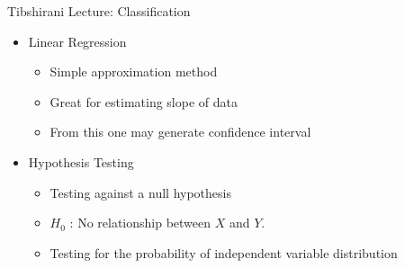 \documentclass{beamer}
\begin{document}
\begin{frame}{Tibshirani Lecture: Classification}
\begin{itemize}
	\item<1-> Linear Regression
	\begin{itemize}
		\item<1-> Simple approximation method
		\item<1-> Great for estimating slope of data
		\item<1-> From this one may generate confidence interval
	\end{itemize}
	\item<2> Hypothesis Testing
	\begin{itemize}
		\item<2> Testing against a null hypothesis
		\item<2>[] $H_0$ : No relationship between $X$ and $Y$.
		\item<2> Testing for the probability of independent variable distribution 
	\end{itemize}
\end{itemize}
\end{frame}
\end{document}
